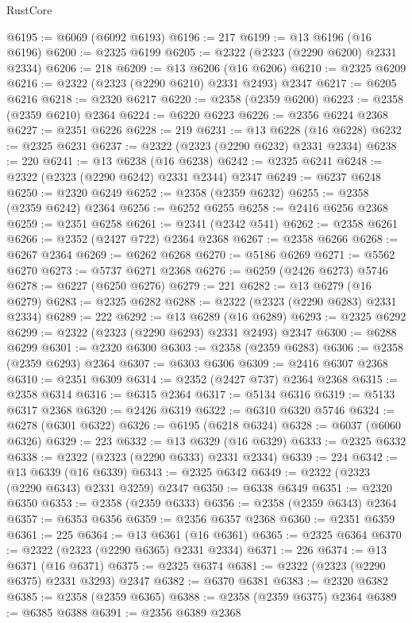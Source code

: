 \begin{lexlean}{RustCore}
\begin{coremodule}
@6195 := @6069 (@6092 @6193)
@6196 := 217
@6199 := @13 @6196 (@16 @6196)
@6200 := @2325 @6199
@6205 := @2322 (@2323 (@2290 @6200) @2331 @2334)
@6206 := 218
@6209 := @13 @6206 (@16 @6206)
@6210 := @2325 @6209
@6216 := @2322 (@2323 (@2290 @6210) @2331 @2493) @2347
@6217 := @6205 @6216
@6218 := @2320 @6217
@6220 := @2358 (@2359 @6200)
@6223 := @2358 (@2359 @6210) @2364
@6224 := @6220 @6223
@6226 := @2356 @6224 @2368
@6227 := @2351 @6226
@6228 := 219
@6231 := @13 @6228 (@16 @6228)
@6232 := @2325 @6231
@6237 := @2322 (@2323 (@2290 @6232) @2331 @2334)
@6238 := 220
@6241 := @13 @6238 (@16 @6238)
@6242 := @2325 @6241
@6248 := @2322 (@2323 (@2290 @6242) @2331 @2344) @2347
@6249 := @6237 @6248
@6250 := @2320 @6249
@6252 := @2358 (@2359 @6232)
@6255 := @2358 (@2359 @6242) @2364
@6256 := @6252 @6255
@6258 := @2416 @6256 @2368
@6259 := @2351 @6258
@6261 := @2341 (@2342 @541)
@6262 := @2358 @6261
@6266 := @2352 (@2427 @722) @2364 @2368
@6267 := @2358 @6266
@6268 := @6267 @2364
@6269 := @6262 @6268
@6270 := @5186 @6269
@6271 := @5562 @6270
@6273 := @5737 @6271 @2368
@6276 := @6259 (@2426 @6273) @5746
@6278 := @6227 (@6250 @6276)
@6279 := 221
@6282 := @13 @6279 (@16 @6279)
@6283 := @2325 @6282
@6288 := @2322 (@2323 (@2290 @6283) @2331 @2334)
@6289 := 222
@6292 := @13 @6289 (@16 @6289)
@6293 := @2325 @6292
@6299 := @2322 (@2323 (@2290 @6293) @2331 @2493) @2347
@6300 := @6288 @6299
@6301 := @2320 @6300
@6303 := @2358 (@2359 @6283)
@6306 := @2358 (@2359 @6293) @2364
@6307 := @6303 @6306
@6309 := @2416 @6307 @2368
@6310 := @2351 @6309
@6314 := @2352 (@2427 @737) @2364 @2368
@6315 := @2358 @6314
@6316 := @6315 @2364
@6317 := @5134 @6316
@6319 := @5133 @6317 @2368
@6320 := @2426 @6319
@6322 := @6310 @6320 @5746
@6324 := @6278 (@6301 @6322)
@6326 := @6195 (@6218 @6324)
@6328 := @6037 (@6060 @6326)
@6329 := 223
@6332 := @13 @6329 (@16 @6329)
@6333 := @2325 @6332
@6338 := @2322 (@2323 (@2290 @6333) @2331 @2334)
@6339 := 224
@6342 := @13 @6339 (@16 @6339)
@6343 := @2325 @6342
@6349 := @2322 (@2323 (@2290 @6343) @2331 @3259) @2347
@6350 := @6338 @6349
@6351 := @2320 @6350
@6353 := @2358 (@2359 @6333)
@6356 := @2358 (@2359 @6343) @2364
@6357 := @6353 @6356
@6359 := @2356 @6357 @2368
@6360 := @2351 @6359
@6361 := 225
@6364 := @13 @6361 (@16 @6361)
@6365 := @2325 @6364
@6370 := @2322 (@2323 (@2290 @6365) @2331 @2334)
@6371 := 226
@6374 := @13 @6371 (@16 @6371)
@6375 := @2325 @6374
@6381 := @2322 (@2323 (@2290 @6375) @2331 @3293) @2347
@6382 := @6370 @6381
@6383 := @2320 @6382
@6385 := @2358 (@2359 @6365)
@6388 := @2358 (@2359 @6375) @2364
@6389 := @6385 @6388
@6391 := @2356 @6389 @2368

\end{coremodule}
\end{lexlean}

